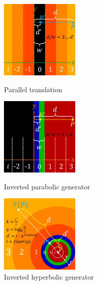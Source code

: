 \begin{figure}[h!tbp]
 \begin{minipage}[t]{0.24\hsize}
  \begin{center}
   \includegraphics[width=1.5in, height=1.5in, keepaspectratio]{../img/klein/2diis/translationMod.pdf}
  \end{center}
  \caption{Parallel translation}
  \label{fig:translationMod}
 \end{minipage}
 \hspace*{\fill}
 \begin{minipage}[t]{0.24\hsize}
  \begin{center}
   \includegraphics[width=1.5in, height=1.5in, keepaspectratio]{../img/klein/2diis/parabolicMod.pdf}
  \end{center}
  \caption{Inverted parabolic generator}
  \label{fig:parabolicMod}
 \end{minipage}
 \hspace*{\fill}
 \begin{minipage}[t]{0.24\hsize}
   \begin{center}
    \includegraphics[width=1.5in, height=1.5in, keepaspectratio]{../img/klein/2diis/hyperbolicMod.pdf}
   \end{center}
   \caption{Inverted hyperbolic generator}
   \label{fig:loxodromicMod}
 \end{minipage}

\end{figure}
